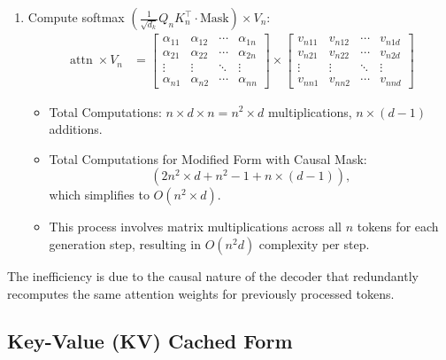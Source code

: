 \documentclass[times, review, 10pt]{elsarticle}
\begin{document}
\begin{enumerate}
    \item[2.] Compute softmax \(\left(\frac{1}{\sqrt{d_k}} Q_n K_n^{\top} \cdot \text{Mask} \right) \times V_n\):
    \begin{align}
        \operatorname{attn} \times V_n &=  %
        \begin{bmatrix}
        \alpha_{11} & \alpha_{12} & \cdots & \alpha_{1n} \\
        \alpha_{21} & \alpha_{22} & \cdots & \alpha_{2n} \\
        \vdots & \vdots & \ddots & \vdots \\
        \alpha_{n1} & \alpha_{n2} & \cdots & \alpha_{nn}
        \end{bmatrix}
        \times
        \begin{bmatrix}
        v_{n11} & v_{n12} & \cdots & v_{n1d} \\
        v_{n21} & v_{n22} & \cdots & v_{n2d} \\
        \vdots & \vdots & \ddots & \vdots \\
        v_{nn1} & v_{nn2} & \cdots & v_{nnd}
        \end{bmatrix}
        \label{eq:app-asym-vanilla-attnV}
    \end{align}
    \begin{itemize}
        \item Total Computations: \(n \times d \times n = n^2 \times d\) multiplications, \(n \times (d-1)\) additions.
        \item Total Computations for Modified Form with Causal Mask:
        \begin{equation}
        \label{eq:app-asym-vanilla-causal}
        \left(2 n^2 \times d + n^2 - 1 + n \times (d-1)\right),
        \end{equation}
        which simplifies to \(O\left(n^2 \times d\right)\).
        \item This process involves matrix multiplications across all \(n\) tokens for each generation step, resulting in \(O\left(n^2 d\right)\) complexity per step.

    \end{itemize}
\end{enumerate}

The inefficiency is due to the causal nature of the decoder that redundantly recomputes the same attention weights for previously processed tokens.


\subsection{Key-Value (KV) Cached Form}
\end{document}
